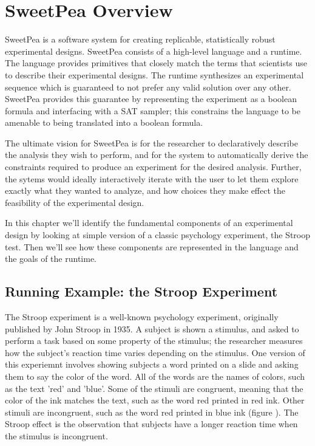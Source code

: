 
\chapter{SweetPea Overview}


SweetPea is a software system for creating replicable, statistically robust experimental designs. SweetPea consists of a high-level language and a runtime. The language provides primitives that closely match the terms that scientists use to describe their experimental designs. The runtime synthesizes an experimental sequence which is guaranteed to not prefer any valid solution over any other. SweetPea provides this guarantee by representing the experiment as a boolean formula and interfacing with a SAT sampler; this constrains the language to be amenable to being translated into a boolean formula.

The ultimate vision for SweetPea is for the researcher to declaratively describe the analysis they wish to perform, and for the system to automatically derive the constraints required to produce an experiment for the desired analysis. Further, the sytems would ideally interactively iterate with the user to let them explore exactly what they wanted to analyze, and how choices they make effect the feasibility of the experimental design.

In this chapter we'll identify the fundamental components of an experimental design by looking at simple version of a classic psychology experiment, the Stroop test. Then we'll see how these components are represented in the language and the goals of the runtime.

\section{Running Example: the Stroop Experiment}

The Stroop experiment is a well-known psychology experiment, originally published by John Stroop in 1935. A subject is shown a stimulus, and asked to perform a task based on some property of the stimulus; the researcher measures how the subject's reaction time varies depending on the stimulus. One version of this experiemnt involves showing subjects a word printed on a slide and asking them to say the color of the word. All of the words are the names of colors, such as the text 'red' and 'blue'. Some of the stimuli are congruent, meaning that the color of the ink matches the text, such as the word red printed in red ink. Other stimuli are incongruent, such as the word red printed in blue ink (figure ). The Stroop effect is the observation that subjects have a longer reaction time when the stimulus is incongruent.

